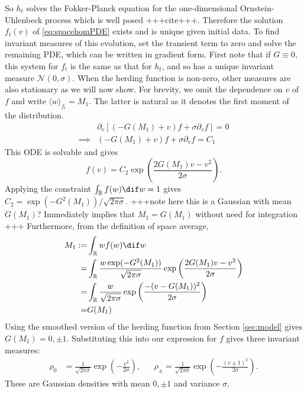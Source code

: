         So $h_t$ solves the Fokker-Planck equation for the one-dimensional Ornstein-Uhlenbeck process which is well posed +++cite+++. Therefore the solution $f_t(v)$ of \eqref{eq:spacehomPDE} exists and is unique given initial data. To find invariant measures of this evolution, set the transient term to zero and solve the remaining PDE, which can be written in gradient form. First note that if $G\equiv 0$, this system for $f_t$ is the same as that for $h_t$, and so has a unique invariant measure $\mathcal{N}(0,\sigma)$. When the herding function is non-zero, other measures are also stationary as we will now show. For brevity, we omit the dependence on $v$ of $f$ and write $\langle w \rangle_{f_t} = M_1$. The latter is natural as it denotes the first moment of the distribution.
        \begin{align*}
            &\partial_v\left[(-G(M_1) +v) f + \sigma \partial_v f \right] = 0\\
            \implies& (-G(M_1) +v) f + \sigma \partial_v f = C_1
        \end{align*}
        This ODE is solvable and gives 
        \[
            f(v) = C_2\exp\left(\frac{2G(M_1)v - v^2}{2\sigma} \right). 
        \]
        Applying the constraint $\int_\R f(w)\dif w = 1$ gives $C_2 = \exp(-G^2(M_1))/\sqrt{2\pi\sigma}$. +++note here this is a Gaussian with mean $G(M_1)$? Immediately implies that $M_1 = G(M_1)$ without need for integration +++ Furthermore, from the definition of space average,
        \begin{align*}
            M_1 :=& \int_\R wf(w) \dif w\\ 
            =& \int_\R \frac{w\exp(-G^2(M_1))}{\sqrt{2\pi\sigma}} \exp\left(\frac{2G(M_1)v - v^2}{2\sigma} \right)\\ 
            =& \int_\R \frac{w}{\sqrt{2\pi\sigma}} \exp\left(\frac{ - (v-G(M_1))^2}{2\sigma} \right)\\
            =& G(M_1)
        \end{align*}
        Using the smoothed version of the herding function from Section \ref{sec:model} gives $G(M_1) = 0, \pm 1$. Substituting this into our expression for $f$ gives three invariant measures:
        \begin{align*}
            \rho_0 &= \frac{1}{\sqrt{2\pi\sigma}}\exp\left(-\frac{v^2}{2\sigma} \right), && \rho_{\pm} = \frac{1}{\sqrt{2\pi\sigma}}\exp\left(-\frac{(v\pm 1)^2}{2\sigma}\right).
        \end{align*}
        These are Gaussian densities with mean $0, \pm 1$ and variance $\sigma$.
        
